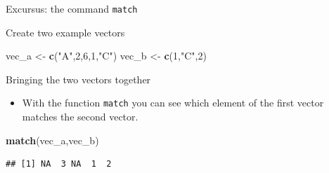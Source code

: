 \documentclass[
  ignorenonframetext,
]{beamer}
\newenvironment{Shaded}{\begin{snugshade}}{\end{snugshade}}
\newcommand{\DecValTok}[1]{\textcolor[rgb]{0.00,0.00,0.81}{#1}}
\newcommand{\KeywordTok}[1]{\textcolor[rgb]{0.13,0.29,0.53}{\textbf{#1}}}
\newcommand{\NormalTok}[1]{#1}
\newcommand{\StringTok}[1]{\textcolor[rgb]{0.31,0.60,0.02}{#1}}
\providecommand{\tightlist}{%
  \setlength{\itemsep}{0pt}\setlength{\parskip}{0pt}}
\begin{document}
\begin{frame}[fragile]{Excursus: the command \texttt{match}}
\protect\hypertarget{excursus-the-command-match}{}
\begin{block}{Create two example vectors}
\protect\hypertarget{create-two-example-vectors}{}
\begin{Shaded}
\begin{Highlighting}[]
\NormalTok{vec\_a \textless{}{-}}\StringTok{ }\KeywordTok{c}\NormalTok{(}\StringTok{"A"}\NormalTok{,}\DecValTok{2}\NormalTok{,}\DecValTok{6}\NormalTok{,}\DecValTok{1}\NormalTok{,}\StringTok{"C"}\NormalTok{)}
\NormalTok{vec\_b \textless{}{-}}\StringTok{ }\KeywordTok{c}\NormalTok{(}\DecValTok{1}\NormalTok{,}\StringTok{"C"}\NormalTok{,}\DecValTok{2}\NormalTok{)}
\end{Highlighting}
\end{Shaded}
\end{block}

\begin{block}{Bringing the two vectors together}
\protect\hypertarget{bringing-the-two-vectors-together}{}
\begin{itemize}
\tightlist
\item
  With the function \texttt{match} you can see which element of the
  first vector matches the second vector.
\end{itemize}

\begin{Shaded}
\begin{Highlighting}[]
\KeywordTok{match}\NormalTok{(vec\_a,vec\_b)}
\end{Highlighting}
\end{Shaded}

\begin{verbatim}
## [1] NA  3 NA  1  2
\end{verbatim}
\end{block}
\end{frame}
\end{document}
